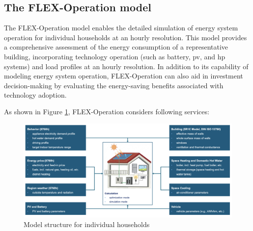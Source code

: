 

\subsection{The FLEX-Operation model}

The FLEX-Operation model \cite{newtrends} enables the detailed simulation of energy system operation for individual households at an hourly resolution. 
This model provides a comprehensive assessment of the energy consumption of a representative building, incorporating technology operation (such as battery, \gls{pv}, and \gls{hp} systems) and load profiles at an hourly resolution. 
In addition to its capability of modeling energy system operation, FLEX-Operation can also aid in investment decision-making by evaluating the energy-saving benefits associated with technology adoption.

As shown in Figure \ref{fig:flex-operation}, FLEX-Operation considers following services:


\begin{figure}[h]
  \centering
  \includegraphics[width=\textwidth]{Images/flex-operation.png}
  \caption{Model structure for individual households}
  \label{fig:flex-operation}
\end{figure}


